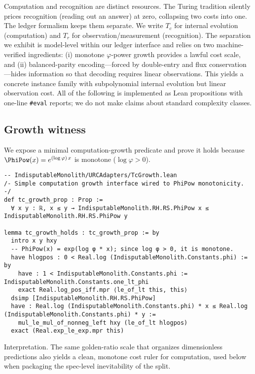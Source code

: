 \documentclass[11pt,a4paper,twoside]{article}
\numberwithin{equation}{section}
\theoremstyle{customthm}
\theoremstyle{customdef}
\theoremstyle{customrem}
\begin{document}
Computation and recognition are distinct resources. The Turing tradition silently prices recognition (reading out an answer) at zero, collapsing two costs into one. The ledger formalism keeps them separate. We write \(T_c\) for internal evolution (computation) and \(T_r\) for observation/measurement (recognition). The separation we exhibit is model-level within our ledger interface and relies on two machine-verified ingredients: (i) monotone \(\varphi\)-power growth provides a lawful cost scale, and (ii) balanced-parity encoding—forced by double-entry and flux conservation—hides information so that decoding requires linear observations. This yields a concrete instance family with subpolynomial internal evolution but linear observation cost. All of the following is implemented as Lean propositions with one-line \texttt{\#eval} reports; we do not make claims about standard complexity classes.

\subsection{Growth witness}\label{subsec:pn-growth}

We expose a minimal computation-growth predicate and prove it holds because \(\PhiPow(x)=e^{(\log \varphi)\,x}\) is monotone (\(\log\varphi>0\)).

\begin{lstlisting}
-- IndisputableMonolith/URCAdapters/TcGrowth.lean
/- Simple computation growth interface wired to PhiPow monotonicity. -/
def tc_growth_prop : Prop :=
  ∀ x y : ℝ, x ≤ y → IndisputableMonolith.RH.RS.PhiPow x ≤ IndisputableMonolith.RH.RS.PhiPow y

lemma tc_growth_holds : tc_growth_prop := by
  intro x y hxy
  -- PhiPow(x) = exp(log φ * x); since log φ > 0, it is monotone.
  have hlogpos : 0 < Real.log (IndisputableMonolith.Constants.phi) := by
    have : 1 < IndisputableMonolith.Constants.phi := IndisputableMonolith.Constants.one_lt_phi
    exact Real.log_pos_iff.mpr ⟨le_of_lt this, this⟩
  dsimp [IndisputableMonolith.RH.RS.PhiPow]
  have : Real.log (IndisputableMonolith.Constants.phi) * x ≤ Real.log (IndisputableMonolith.Constants.phi) * y :=
    mul_le_mul_of_nonneg_left hxy (le_of_lt hlogpos)
  exact (Real.exp_le_exp.mpr this)
\end{lstlisting}

Interpretation. The same golden-ratio scale that organizes dimensionless predictions also yields a clean, monotone cost ruler for computation, used below when packaging the spec-level inevitability of the split.
\end{document}
